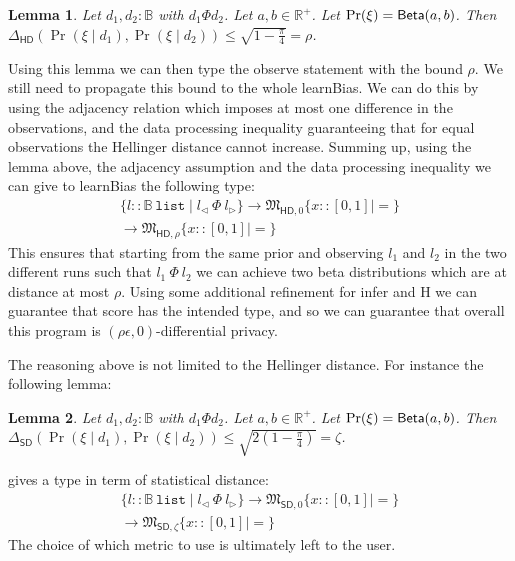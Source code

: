 \documentclass{sig-alternate-05-2015}
\theoremstyle{plain}
\newtheorem{lemma}{Lemma}[section]
\theoremstyle{definition}
\theoremstyle{corollary}
\def\kwlist{\mathtt{list}}
\newcommand{\stbool}[0]{\mathbb{B}}
\newcommand{\stlist}[1]{{#1}\ \kwlist}
\def\lvmark{\triangleleft}
\def\rvmark{\triangleright}
\renewcommand{\l}[1]{#1_\lvmark}
\renewcommand{\r}[1]{#1_\rvmark}
\def\R{\mathbb{R}}
\newcommand{\rplus}{\R^+}
\begin{document}
\begin{lemma}
\label{hdlemma}
Let $d_1, d_2: \stbool$ with $d_1 \Phi d_2$. Let $a,b \in \rplus$. Let
$\Pr(\xi)={\sf Beta}(a,b)$. Then
$\Delta_{\mathsf{HD}}(\Pr(\xi \mid d_1), \Pr(\xi \mid d_2))\leq
\sqrt{1-\frac{\pi}{4}}=\rho$.
\end{lemma}
Using this lemma we can then type the {\sf observe} statement with the
bound $\rho$. 
We still need to propagate this bound to the whole {\sf learnBias}. We
can do this by using the adjacency relation which imposes at most one
difference in the observations, and the data processing inequality
 guaranteeing that for equal observations the
Hellinger distance cannot increase.
Summing up,  using the lemma above, the adjacency assumption and the data
processing inequality  we can give to {\sf learnBias} the following type:   
\begin{multline*} 
\{l:: \stlist{\stbool} \mid\l{l}\ \Phi\ \r{l}\}\rightarrow\mathfrak{M}_{\mathsf{HD},
  0}\{x:: [0,1] \mid = \}\\
\rightarrow\mathfrak{M}_{\mathsf{HD}, \rho}\{x:: [0,1]
\mid= \}
\end{multline*}
This ensures that starting from the same
prior and observing $l_1$ and $l_2$ in the two different runs such that
$l_1\ \Phi\ l_2$ 
we can achieve two beta distributions which are at distance at most $\rho$.
Using some additional refinement for {\sf infer} and {\sf H} we can guarantee that
{\sf score} has the intended type, and so we can guarantee that
overall this program is 
$(\rho\epsilon,0)$-differential privacy. 

The reasoning above is not limited to the Hellinger distance. For instance the following lemma:
\begin{lemma}
Let $d_1, d_2: \stbool$ with $d_1 \Phi d_2$. Let $a,b \in \rplus$. Let
$\Pr(\xi)={\sf Beta}(a,b)$. Then
$\Delta_{\mathsf{SD}}(\Pr(\xi \mid d_1), \Pr(\xi \mid d_2))\leq
\sqrt{2(1-\frac{\pi}{4})}=\zeta$.
\end{lemma}
\noindent gives a type in term
of statistical distance:
\begin{multline*} 
\{l:: \stlist{\stbool} \mid\l{l}\ \Phi\ \r{l}\}\rightarrow\mathfrak{M}_{\mathsf{SD},
  0}\{x:: [0,1] \mid = \}\\
\rightarrow\mathfrak{M}_{\mathsf{SD}, \zeta}\{x:: [0,1]
\mid= \}
\end{multline*}
The choice of which metric to use is ultimately left to the user.
\end{document}

